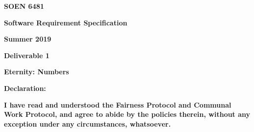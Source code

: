 \documentclass[12pt]{article}
\begin{document}
\begin{Center}
{\fontsize{16pt}{19.2pt}\selectfont \textbf{SOEN 6481}\par}
\end{Center}\par

\begin{Center}
{\fontsize{16pt}{19.2pt}\selectfont \textbf{Software Requirement Specification}\par}
\end{Center}\par

\begin{Center}
{\fontsize{16pt}{19.2pt}\selectfont \textbf{Summer 2019}\par}
\end{Center}\par

\begin{Center}
{\fontsize{16pt}{19.2pt}\selectfont \textbf{Deliverable 1}\par}
\end{Center}\par

\begin{Center}
{\fontsize{16pt}{19.2pt}\selectfont \textbf{Eternity: Numbers}\par}
\end{Center}\par


\vspace{\baselineskip}

\vspace{\baselineskip}
\begin{Center}
{\fontsize{16pt}{19.2pt}\selectfont \textbf{Declaration:}\par}
\end{Center}\par


\vspace{\baselineskip}

\vspace{\baselineskip}
\begin{justify}
\textbf{I have read and understood the Fairness Protocol and Communal Work Protocol, and agree to abide by the policies therein, without any exception under any circumstances, whatsoever.}
\end{justify}\par


\vspace{\baselineskip}
\end{document}
